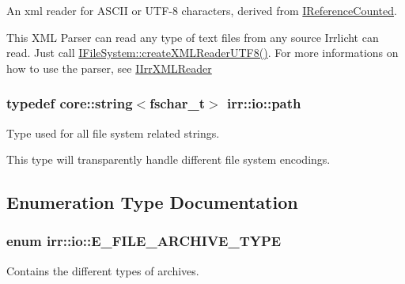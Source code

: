 An xml reader for A\+S\+C\+II or U\+T\+F-\/8 characters, derived from \hyperlink{classirr_1_1IReferenceCounted}{I\+Reference\+Counted}. 

This X\+ML Parser can read any type of text files from any source Irrlicht can read. Just call \hyperlink{classirr_1_1io_1_1IFileSystem_affd8f622ac7c3dcd507f20f9cd23b21f}{I\+File\+System\+::create\+X\+M\+L\+Reader\+U\+T\+F8()}. For more informations on how to use the parser, see \hyperlink{classirr_1_1io_1_1IIrrXMLReader}{I\+Irr\+X\+M\+L\+Reader} 
\subsubsection[{\texorpdfstring{path}{path}}]{\setlength{\rightskip}{0pt plus 5cm}typedef {\bf core\+::string}$<${\bf fschar\+\_\+t}$>$ {\bf irr\+::io\+::path}}\hypertarget{namespaceirr_1_1io_ab1bdc45edb3f94d8319c02bc0f840ee1}{}\label{namespaceirr_1_1io_ab1bdc45edb3f94d8319c02bc0f840ee1}


Type used for all file system related strings. 

This type will transparently handle different file system encodings. 

\subsection{Enumeration Type Documentation}
\subsubsection[{\texorpdfstring{E\+\_\+\+F\+I\+L\+E\+\_\+\+A\+R\+C\+H\+I\+V\+E\+\_\+\+T\+Y\+PE}{E\_FILE\_ARCHIVE\_TYPE}}]{\setlength{\rightskip}{0pt plus 5cm}enum {\bf irr\+::io\+::\+E\+\_\+\+F\+I\+L\+E\+\_\+\+A\+R\+C\+H\+I\+V\+E\+\_\+\+T\+Y\+PE}}\hypertarget{namespaceirr_1_1io_adb3e3c445ec8e608ed1f0f93306da14f}{}\label{namespaceirr_1_1io_adb3e3c445ec8e608ed1f0f93306da14f}


Contains the different types of archives. 

